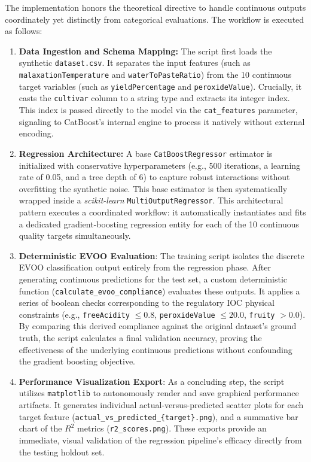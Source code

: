 \documentclass[11pt,a4paper]{article}
\begin{document}
The implementation honors the theoretical directive to handle continuous outputs coordinately yet distinctly from categorical evaluations. The workflow is executed as follows:
\begin{enumerate}
    \item \textbf{Data Ingestion and Schema Mapping:} The script first loads the synthetic \texttt{dataset.csv}. It separates the input features (such as \texttt{malaxationTemperature} and \texttt{waterToPasteRatio}) from the 10 continuous target variables (such as \texttt{yieldPercentage} and \texttt{peroxideValue}). Crucially, it casts the \texttt{cultivar} column to a string type and extracts its integer index. This index is passed directly to the model via the \texttt{cat\_features} parameter, signaling to CatBoost's internal engine to process it natively without external encoding.
    \item \textbf{Regression Architecture:} A base \texttt{CatBoostRegressor} estimator is initialized with conservative hyperparameters (e.g., 500 iterations, a learning rate of 0.05, and a tree depth of 6) to capture robust interactions without overfitting the synthetic noise. This base estimator is then systematically wrapped inside a \textit{scikit-learn} \texttt{MultiOutputRegressor}. This architectural pattern executes a coordinated workflow: it automatically instantiates and fits a dedicated gradient-boosting regression entity for each of the 10 continuous quality targets simultaneously.
    \item \textbf{Deterministic EVOO Evaluation}: The training script isolates the discrete EVOO classification output entirely from the regression phase. After generating continuous predictions for the test set, a custom deterministic function (\texttt{calculate\_evoo\_compliance}) evaluates these outputs. It applies a series of boolean checks corresponding to the regulatory IOC physical constraints (e.g., \texttt{freeAcidity} $\le 0.8$, \texttt{peroxideValue} $\le 20.0$, \texttt{fruity} $> 0.0$). By comparing this derived compliance against the original dataset's ground truth, the script calculates a final validation accuracy, proving the effectiveness of the underlying continuous predictions without confounding the gradient boosting objective.
    \item \textbf{Performance Visualization Export}: As a concluding step, the script utilizes \texttt{matplotlib} to autonomously render and save graphical performance artifacts. It generates individual actual-versus-predicted scatter plots for each target feature (\texttt{actual\_vs\_predicted\_\{target\}.png}), and a summative bar chart of the $R^2$ metrics (\texttt{r2\_scores.png}). These exports provide an immediate, visual validation of the regression pipeline's efficacy directly from the testing holdout set.
\end{enumerate}
\end{document}
